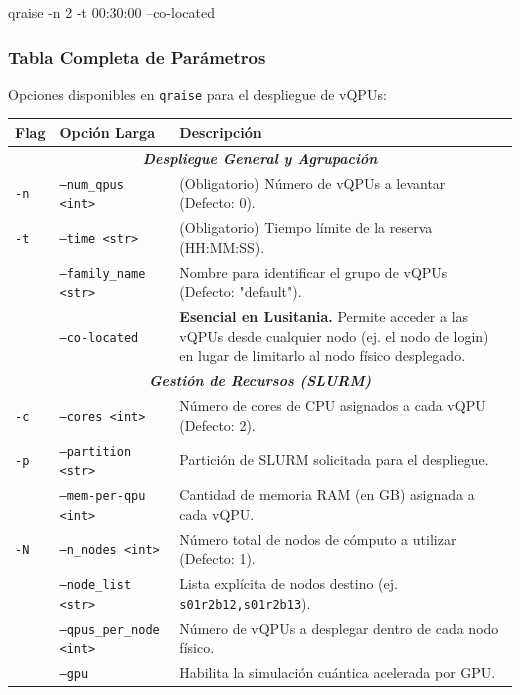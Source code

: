 \documentclass[a4paper,11pt]{article}
\begin{document}
\begin{terminal}
qraise -n 2 -t 00:30:00 --co-located
\end{terminal}

\newpage
\subsubsection{Tabla Completa de Parámetros}
Opciones disponibles en \texttt{qraise} para el despliegue de vQPUs:

\begin{center}
\renewcommand{\arraystretch}{1.2}
\small
\begin{tabular}{@{} l p{4.8cm} p{8.0cm} @{}}
    \toprule
    \textbf{Flag} & \textbf{Opción Larga} & \textbf{Descripción} \\ 
    \midrule
    
    \multicolumn{3}{c}{\textbf{\textit{Despliegue General y Agrupación}}} \\
    \texttt{-n} & \texttt{--num\_qpus <int>} & (Obligatorio) Número de vQPUs a levantar (Defecto: 0). \\
    \texttt{-t} & \texttt{--time <str>} & (Obligatorio) Tiempo límite de la reserva (HH:MM:SS). \\
    \texttt{} & \texttt{--family\_name <str>} & Nombre para identificar el grupo de vQPUs (Defecto: "default"). \\
    \texttt{} & \texttt{--co-located} & \textbf{Esencial en Lusitania.} Permite acceder a las vQPUs desde cualquier nodo (ej. el nodo de login) en lugar de limitarlo al nodo físico desplegado. \\
    \midrule
    
    \multicolumn{3}{c}{\textbf{\textit{Gestión de Recursos (SLURM)}}} \\
    \texttt{-c} & \texttt{--cores <int>} & Número de cores de CPU asignados a cada vQPU (Defecto: 2). \\
    \texttt{-p} & \texttt{--partition <str>} & Partición de SLURM solicitada para el despliegue. \\
    \texttt{} & \texttt{--mem-per-qpu <int>} & Cantidad de memoria RAM (en GB) asignada a cada vQPU. \\
    \texttt{-N} & \texttt{--n\_nodes <int>} & Número total de nodos de cómputo a utilizar (Defecto: 1). \\
    \texttt{} & \texttt{--node\_list <str>} & Lista explícita de nodos destino (ej. \texttt{s01r2b12,s01r2b13}). \\
    \texttt{} & \texttt{--qpus\_per\_node <int>} & Número de vQPUs a desplegar dentro de cada nodo físico. \\
    \texttt{} & \texttt{--gpu} & Habilita la simulación cuántica acelerada por GPU. \\
    \midrule


\end{tabular}
\end{center}
\end{document}
